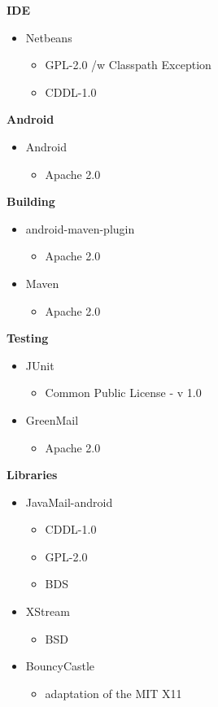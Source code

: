 	{\bf IDE}
		\begin{itemize}
			\item Netbeans\cite{bib:nli}
				\begin{itemize}
					\item GPL-2.0 /w Classpath Exception
					\item CDDL-1.0
				\end{itemize}
		\end{itemize}
	{\bf Android}
		\begin{itemize}
			\item Android\cite{bib:ali}
				\begin{itemize}
					\item Apache 2.0
				\end{itemize}
		\end{itemize}
	{\bf Building}
		\begin{itemize}
			\item android-maven-plugin\cite{bib:amli}
				\begin{itemize}
					\item Apache 2.0
				\end{itemize}
			\item Maven\cite{bib:mli}
				\begin{itemize}
					\item Apache 2.0
				\end{itemize}
		\end{itemize}
	{\bf Testing}
		\begin{itemize}
			\item JUnit\cite{bib:jli}
				\begin{itemize}
					\item Common Public License - v 1.0
				\end{itemize}
			\item GreenMail\cite{bib:gli}
				\begin{itemize}
					\item Apache 2.0
				\end{itemize}
		\end{itemize}
	{\bf Libraries}
		\begin{itemize}
			\item JavaMail-android\cite{bib:jmli}
				\begin{itemize}
					\item CDDL-1.0
					\item GPL-2.0
					\item BDS
				\end{itemize}
			\item XStream\cite{bib:xli}
				\begin{itemize}
					\item BSD
				\end{itemize}
			\item BouncyCastle\cite{bib:bcli}
				\begin{itemize}
					\item adaptation of the MIT X11
				\end{itemize}
		\end{itemize}
